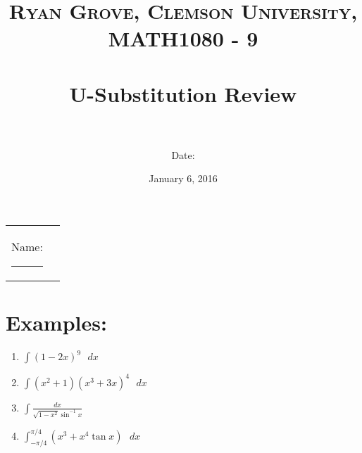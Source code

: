 \documentclass[paper=a4, fontsize=11pt]{scrartcl} %
\title{	
\normalfont \normalsize 
\textsc{Ryan Grove, Clemson University, MATH1080 - 9} \\ [25pt] %
\horrule{0.5pt} \\[0.4cm] %
\huge U-Substitution Review \\ %
\horrule{2pt} \\[0.5cm] %
}
\author{Date:} %
\date{\normalsize January 6, 2016} %
\numberwithin{equation}{section} %
\numberwithin{figure}{section} %
\numberwithin{table}{section} %
\begin{document}
\maketitle %

\begin{flushleft}
\begin{tabular}{l l}
Name: \rule{3.2in}{.01cm}  & {}%
\end{tabular}
\end{flushleft}


\section*{\textbf{Examples:}}

\begin{enumerate}
\setlength{\itemsep}{0.45in}
\item $\displaystyle \int (1-2x)^9 \text{ } dx$
\newpage
\item $\displaystyle \int (x^2+1)(x^3+3x)^4 \text{ } dx$
\vspace{2in}
\item $\displaystyle \int \frac{dx}{\sqrt{1-x^2}\sin^{-1}x}$
\vspace{2in}
\item $\displaystyle \int^{\pi/4}_{-\pi/4} (x^3+x^4 \tan x) \text{ } dx$
\end{enumerate}

\end{document}

